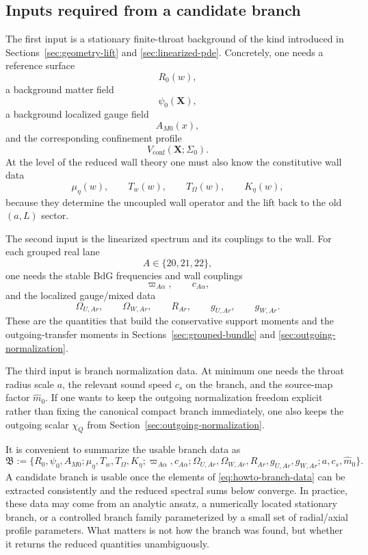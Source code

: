 \documentclass[11pt]{article}
\theoremstyle{definition}
\newcommand{\mhat}{\ensuremath{\hat m_0}}
\newcommand{\conf}{\mathrm{conf}}
\begin{document}
\subsection{Inputs required from a candidate branch}

The first input is a stationary finite-throat background of the kind introduced in Sections~\ref{sec:geometry-lift} and \ref{sec:linearized-pde}. Concretely, one needs a reference surface
\[
R_0(w),
\]
a background matter field
\[
\psi_0(\mathbf X),
\]
a background localized gauge field
\[
A_{M0}(x),
\]
and the corresponding confinement profile
\[
V_{\conf}(\mathbf X;\Sigma_0).
\]
At the level of the reduced wall theory one must also know the constitutive wall data
\[
\mu_\eta(w),\qquad T_w(w),\qquad T_\Omega(w),\qquad K_\eta(w),
\]
because they determine the uncoupled wall operator and the lift back to the old $(a,L)$ sector.

The second input is the linearized spectrum and its couplings to the wall. For each grouped real lane
\[
A\in\{20,21,22\},
\]
one needs the stable BdG frequencies and wall couplings
\[
\varpi_{A\alpha},\qquad c_{A\alpha},
\]
and the localized gauge/mixed data
\[
\Omega_{U,Ar},\qquad \Omega_{W,Ar},\qquad R_{Ar},\qquad g_{U,Ar},\qquad g_{W,Ar}.
\]
These are the quantities that build the conservative support moments and the outgoing-transfer moments in Sections~\ref{sec:grouped-bundle} and \ref{sec:outgoing-normalization}.

The third input is branch normalization data. At minimum one needs the throat radius scale $a$, the relevant sound speed $c_s$ on the branch, and the source-map factor \(\mhat\). If one wants to keep the outgoing normalization freedom explicit rather than fixing the canonical compact branch immediately, one also keeps the outgoing scalar \(\chi_Q\) from Section~\ref{sec:outgoing-normalization}.

It is convenient to summarize the usable branch data as
\begin{equation}
 \mathfrak B
 :=
 \bigl\{
 R_0,\psi_0,A_{M0};
 \mu_\eta,T_w,T_\Omega,K_\eta;
 \varpi_{A\alpha},c_{A\alpha};
 \Omega_{U,Ar},\Omega_{W,Ar},R_{Ar},g_{U,Ar},g_{W,Ar};
 a,c_s,\mhat
 \bigr\}.
 \label{eq:howto-branch-data}
\end{equation}
A candidate branch is usable once the elements of \eqref{eq:howto-branch-data} can be extracted consistently and the reduced spectral sums below converge. In practice, these data may come from an analytic ansatz, a numerically located stationary branch, or a controlled branch family parameterized by a small set of radial/axial profile parameters. What matters is not how the branch was found, but whether it returns the reduced quantities unambiguously.
\end{document}

